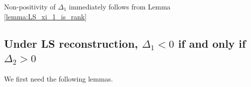 Non-positivity of $\Delta_{1}$ immediately follows from Lemma \ref{lemma:LS_xi_1_is_rank}


\subsection{Under LS reconstruction, \texorpdfstring{$\Delta_{1} < 0$ if and only if $ \Delta_{2} > 0$
}{\textDelta\textoneinferior < 0 if and only if \textDelta\texttwoinferior > 0}}
\label{app:Delta_LS_opposite_signs}
We first need the following lemmas.

